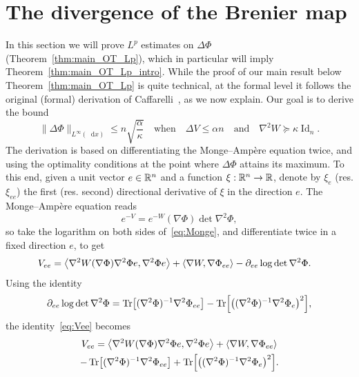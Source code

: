 \documentclass[10pt]{amsart}
\theoremstyle{definition}\newtheorem{defi}[theo]{Definition}\newtheorem{rema}[theo]{Remark}\newtheorem{exam}[theo]{Example}\newtheorem{exem}[theo]{Example}\newtheorem{nota}[theo]{Notation}
\newcommand{\R}{\mathbb R}
\DeclareMathOperator{\Id}{Id}
\DeclareMathOperator{\Tr}{Tr}
\newcommand{\V}{V}
\newcommand{\W}{W}
\newcommand{\dd}{n}
\newcommand{\lsh}{\alpha}
\newcommand{\lc}{\kappa}
\newcommand*\diff{\mathop{}\!\mathrm{d}}
\newcommand{\OT}{\Phi}
\renewcommand*{\to}{\mathchoice{\longrightarrow}{\rightarrow}{\rightarrow}{\rightarrow}}
\let\originalleft\left
\let\originalright\right
\renewcommand{\left}{\mathopen{}\mathclose\bgroup\originalleft}
\renewcommand{\right}{\aftergroup\egroup\originalright}
\let\oldin\in
\renewcommand{\in}{\mathchoice{\oldin}{\oldin}{\,\oldin\,}{\,\oldin\,}}
\begin{document}
\section{The divergence of the Brenier map}\label{sec:divergence_OT}
In this section we will prove $L^p$ estimates on $\Delta\OT$ (Theorem~\ref{thm:main_OT_Lp}), which in particular will imply Theorem~\ref{thm:main_OT_Lp_intro}. While the proof of our main result below Theorem~\ref{thm:main_OT_Lp} is quite technical, at the formal level it follows the original (formal) derivation of Caffarelli~\cite{MR1800860}, as we now explain. Our goal is to derive the bound
\begin{equation}\label{eq:infty_bound_main_sec}
\|\Delta\OT\|_{L^{\infty}(\diff x)}\le \dd\sqrt{ \frac{\lsh}{\lc}} \quad \text{when}\quad \Delta \V\le \lsh\dd\quad\text{and}\quad \nabla^2\W\succeq \lc \Id_{\dd}.
\end{equation}
The derivation is based on differentiating the Monge--Ampère equation twice, and using the optimality conditions at the point where $\Delta\OT$ attains its maximum. To this end, given a unit vector $e\in \R^{\dd}$ and a function $\xi:\R^{\dd}\to \R$, denote by $\xi_e$ (res. $\xi_{ee}$) the first (res. second) directional derivative of $\xi$ in the direction $e$. The Monge--Ampère equation reads
\begin{equation}\label{eq:Monge}
e^{-\V}=e^{-\W}(\nabla \OT)\det\nabla^2\OT,
\end{equation}
so take the logarithm on both sides of~\eqref{eq:Monge}, and differentiate twice in a fixed direction $e$, to get
\begin{align}\label{eq:Vee}
\V_{ee}&=\left\langle \nabla^2\W(\nabla\OT)\nabla^2\OT e,\nabla^2\OT e\right\rangle+\langle \nabla\W,\nabla\OT_{ee}\rangle-\partial_{ee}\log\det \nabla^2\OT.
\end{align}
Using the identity
\begin{equation}\label{eq:Jacobi_ee}
\partial_{ee}\log\det \nabla^2\OT=\Tr\left[(\nabla^2\OT)^{-1}\nabla^2\OT_{ee}\right]-\Tr\left[\left((\nabla^2\OT)^{-1}\nabla^2\OT_e\right)^2\right],
\end{equation}
the identity~\eqref{eq:Vee} becomes
\begin{multline}\label{eq:Vee+}
\V_{ee}=\left\langle \nabla^2\W(\nabla\OT)\nabla^2\OT e,\nabla^2\OT e\right\rangle+\langle \nabla\W,\nabla\OT_{ee}\rangle\\
-\Tr\left[(\nabla^2\OT)^{-1}\nabla^2\OT_{ee}\right]+\Tr\left[\left((\nabla^2\OT)^{-1}\nabla^2\OT_e\right)^2\right].
\end{multline}
\end{document}
